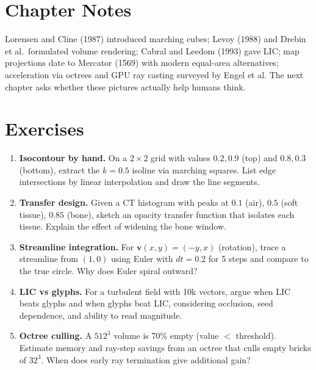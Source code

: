 \section{Chapter Notes}
Lorensen and Cline (1987) introduced marching cubes; Levoy (1988) and Drebin et al.\ formulated volume rendering; Cabral and Leedom (1993) gave LIC; map projections date to Mercator (1569) with modern equal-area alternatives; acceleration via octrees and GPU ray casting surveyed by Engel et al. The next chapter asks whether these pictures actually help humans think.

\section{Exercises}
\label{sec:ch06-exercises}
\begin{enumerate}[label=E6.\arabic*, leftmargin=*, itemsep=0.8em]
    \item \textbf{Isocontour by hand.} On a $2\times2$ grid with values $0.2,0.9$ (top) and $0.8,0.3$ (bottom), extract the $k=0.5$ isoline via marching squares. List edge intersections by linear interpolation and draw the line segments.
    \item \textbf{Transfer design.} Given a CT histogram with peaks at $0.1$ (air), $0.5$ (soft tissue), $0.85$ (bone), sketch an opacity transfer function that isolates each tissue. Explain the effect of widening the bone window.
    \item \textbf{Streamline integration.} For $\mathbf{v}(x,y)=(-y,x)$ (rotation), trace a streamline from $(1,0)$ using Euler with $dt=0.2$ for 5 steps and compare to the true circle. Why does Euler spiral outward?
    \item \textbf{LIC vs glyphs.} For a turbulent field with 10k vectors, argue when LIC beats glyphs and when glyphs beat LIC, considering occlusion, seed dependence, and ability to read magnitude.
    \item \textbf{Octree culling.} A $512^3$ volume is 70\% empty (value $<$ threshold). Estimate memory and ray-step savings from an octree that culls empty bricks of $32^3$. When does early ray termination give additional gain?
\end{enumerate}
